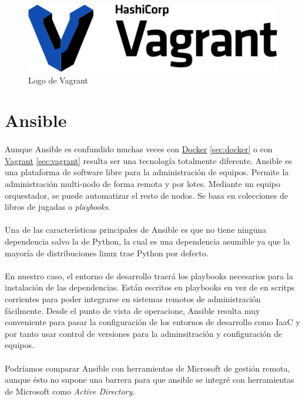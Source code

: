 \begin{figure}[H]
	\centering
	\includegraphics[width=0.50\linewidth]{imgs/vagrant-logo}
	\caption[Vagrant Logo]{Logo de Vagrant}
	\label{fig:vagrant}
\end{figure}

\section{Ansible}\label{sec:ansible}

\paragraph{}Aunque Ansible es confundido muchas veces con \hyperref[sec:docker]{Docker} \ref{sec:docker}
o con \hyperref[sec:vagrant]{Vagrant} \ref{sec:vagrant} resulta ser una tecnología
totalmente diferente. Ansible es una plataforma de software libre para la administración
de equipos. Permite la administración multi-nodo de forma remota y por lotes. Mediante
un equipo orquestador, se puede automatizar el resto de nodos. Se basa en colecciones
de libros de jugadas o \emph{playbooks}.

\paragraph{}Una de las características principales de Ansible es que no tiene ninguna
dependencia salvo la de Python, la cual es una dependencia asumible ya que la mayoría
de distribuciones linux trae Python por defecto.

\paragraph{}En nuestro caso, el entorno de desarrollo traerá los playbooks necesarios
para la instalación de las dependencias. Están escritos en playbooks en vez de en scritps
corrientes para poder integrarse en sistemas remotos de administración fácilmente. Desde
el punto de vista de operacione, Ansible resulta muy conveniente para pasar la configuración
de los entornos de desarrollo como \gls{IaaC} y por tanto usar control de versiones para
la adminsitración y configuración de equipos.

\paragraph{}Podríamos comparar Ansible con herramientas de Microsoft de gestión remota,
aunque ésto no supone una barrera para que ansible se integré con herramientas de Microsoft
como \emph{Active Directory}.

